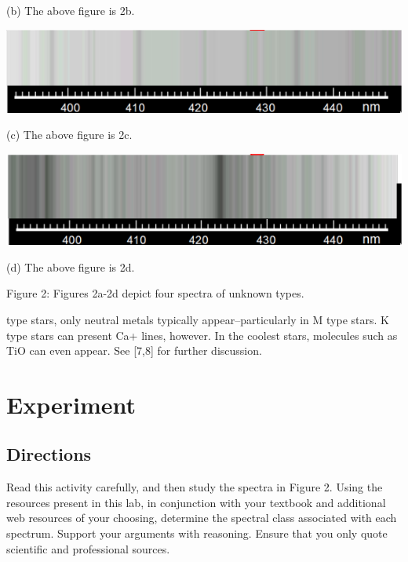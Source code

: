 \documentclass[12pt]{article}
\begin{document}
\centerline{(b) The above figure is 2b.}


\begin{center}
    \includegraphics[scale=0.5]{fig2c}
\end{center}

\centerline{(c) The above figure is 2c.}

\begin{center}
    \includegraphics[scale=0.5]{fig2d}
\end{center}
\centerline{(d) The above figure is 2d.}

Figure 2: Figures 2a-2d depict four spectra of unknown types.\newline

type stars, only neutral metals typically appear–particularly in M type stars. K type stars can present Ca+ lines, however. In the coolest stars, molecules such as TiO can even appear. See [7,8] for further discussion.

\section{Experiment}

\subsection{Directions}

Read this activity carefully, and then study the spectra in Figure 2. Using the
resources present in this lab, in conjunction with your textbook and additional
web resources of your choosing, determine the spectral class associated with
each spectrum. Support your arguments with reasoning. Ensure that you only
quote scientific and professional sources.
\end{document}
